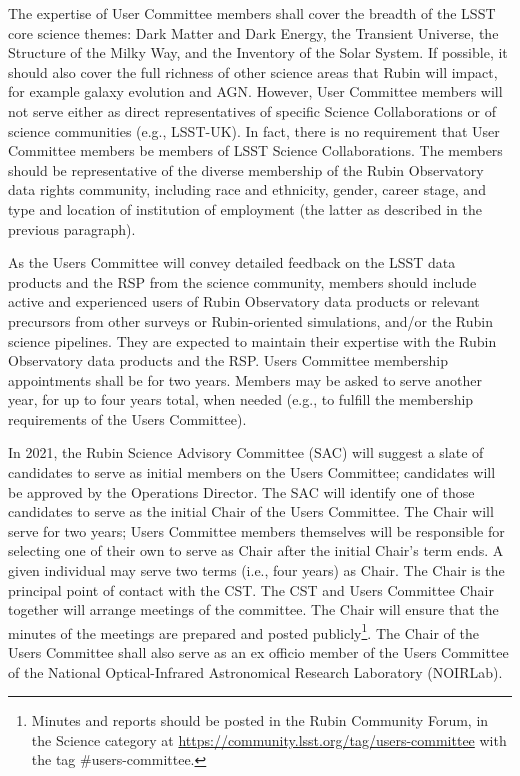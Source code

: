\documentclass[OPS,toc]{lsstdoc}
\begin{document}
The expertise of User Committee members shall cover the breadth of the LSST core science themes: Dark Matter and Dark Energy, the Transient Universe, the Structure of the Milky Way, and the Inventory of the Solar System.
If possible, it should also cover the full richness of other science areas that Rubin will impact, for example galaxy evolution and AGN.
However, User Committee members will not serve either as direct representatives of specific Science Collaborations or of science communities (e.g., LSST-UK).
In fact, there is no requirement that User Committee members be members of LSST Science Collaborations.
The members should be representative of the diverse membership of the Rubin Observatory data rights community, including race and ethnicity, gender, career stage, and type and location of institution of employment (the latter as described in the previous paragraph).

As the Users Committee will convey detailed feedback on the LSST data products and the RSP from the science community, members should include active and experienced users of Rubin Observatory data products or relevant precursors from other surveys or Rubin-oriented simulations, and/or the Rubin science pipelines.
They are expected to maintain their expertise with the Rubin Observatory data products and the RSP.
Users Committee membership appointments shall be for two years. 
Members may be asked to serve another year, for up to four years total, when needed (e.g., to fulfill the membership requirements of the Users Committee).

In 2021, the Rubin Science Advisory Committee (SAC) will suggest a slate of candidates to serve as initial members on the Users Committee; candidates will be approved by the Operations Director.
The SAC will identify one of those candidates to serve as the initial Chair of the Users Committee.
The Chair will serve for two years; Users Committee members themselves will be responsible for selecting one of their own to serve as Chair after the initial Chair’s term ends.
A given individual may serve two terms (i.e., four years) as Chair.
The Chair is the principal point of contact with the CST.
The CST and Users Committee Chair together will arrange meetings of the committee.
The Chair will ensure that the minutes of the meetings are prepared and posted publicly\footnote{
Minutes and reports should be posted in the Rubin Community Forum, in the Science category at \url{https://community.lsst.org/tag/users-committee} with the tag \#users-committee.}. 
The Chair of the Users Committee shall also serve as an ex officio member of the Users Committee of the National Optical-Infrared Astronomical Research Laboratory (NOIRLab). 
\end{document}
